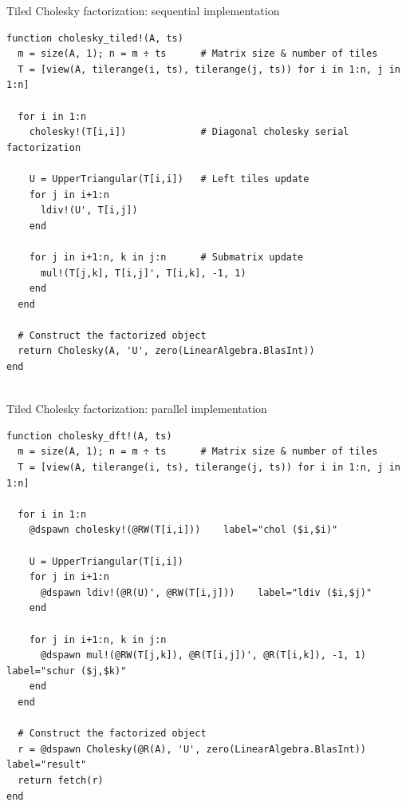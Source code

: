 \documentclass{beamer}
\begin{document}
\begin{frame}[fragile]{Tiled Cholesky factorization: sequential implementation}
  \begin{verbatim}
function cholesky_tiled!(A, ts)
  m = size(A, 1); n = m ÷ ts      # Matrix size & number of tiles
  T = [view(A, tilerange(i, ts), tilerange(j, ts)) for i in 1:n, j in 1:n]

  for i in 1:n
    cholesky!(T[i,i])             # Diagonal cholesky serial factorization

    U = UpperTriangular(T[i,i])   # Left tiles update
    for j in i+1:n
      ldiv!(U', T[i,j])
    end

    for j in i+1:n, k in j:n      # Submatrix update
      mul!(T[j,k], T[i,j]', T[i,k], -1, 1)
    end
  end

  # Construct the factorized object
  return Cholesky(A, 'U', zero(LinearAlgebra.BlasInt))
end
  
  \end{verbatim}
\end{frame}


\begin{frame}[fragile]{Tiled Cholesky factorization: parallel implementation}
  \begin{verbatim}
function cholesky_dft!(A, ts)
  m = size(A, 1); n = m ÷ ts      # Matrix size & number of tiles
  T = [view(A, tilerange(i, ts), tilerange(j, ts)) for i in 1:n, j in 1:n]

  for i in 1:n
    @dspawn cholesky!(@RW(T[i,i]))    label="chol ($i,$i)"

    U = UpperTriangular(T[i,i])
    for j in i+1:n
      @dspawn ldiv!(@R(U)', @RW(T[i,j]))    label="ldiv ($i,$j)"
    end

    for j in i+1:n, k in j:n
      @dspawn mul!(@RW(T[j,k]), @R(T[i,j])', @R(T[i,k]), -1, 1) label="schur ($j,$k)"
    end
  end

  # Construct the factorized object
  r = @dspawn Cholesky(@R(A), 'U', zero(LinearAlgebra.BlasInt)) label="result"
  return fetch(r)
end 
  \end{verbatim}
\end{frame}
\end{document}
